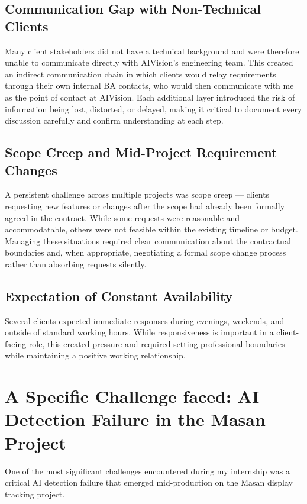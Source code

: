 \subsection{Communication Gap with Non-Technical Clients}

Many client stakeholders did not have a technical background and were therefore unable to communicate directly with AIVision's engineering team. This created an indirect communication chain in which clients would relay requirements through their own internal BA contacts, who would then communicate with me as the point of contact at AIVision. Each additional layer introduced the risk of information being lost, distorted, or delayed, making it critical to document every discussion carefully and confirm understanding at each step.

\subsection{Scope Creep and Mid-Project Requirement Changes}

A persistent challenge across multiple projects was scope creep — clients requesting new features or changes after the scope had already been formally agreed in the contract. While some requests were reasonable and accommodatable, others were not feasible within the existing timeline or budget. Managing these situations required clear communication about the contractual boundaries and, when appropriate, negotiating a formal scope change process rather than absorbing requests silently.

\subsection{Expectation of Constant Availability}

Several clients expected immediate responses during evenings, weekends, and outside of standard working hours. While responsiveness is important in a client-facing role, this created pressure and required setting professional boundaries while maintaining a positive working relationship.

\section{A Specific Challenge faced: AI Detection Failure in the Masan Project}

One of the most significant challenges encountered during my internship was a critical AI detection failure that emerged mid-production on the Masan display tracking project.

